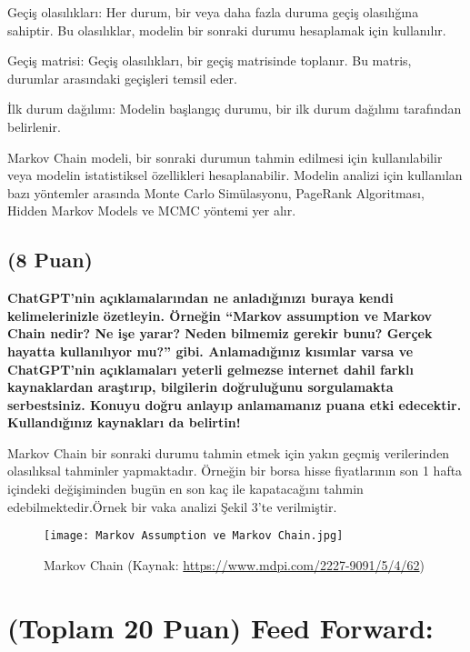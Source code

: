 \documentclass[11pt]{article}
\begin{document}
Geçiş olasılıkları: Her durum, bir veya daha fazla duruma geçiş olasılığına sahiptir. Bu olasılıklar, modelin bir sonraki durumu hesaplamak için kullanılır.

Geçiş matrisi: Geçiş olasılıkları, bir geçiş matrisinde toplanır. Bu matris, durumlar arasındaki geçişleri temsil eder.

İlk durum dağılımı: Modelin başlangıç durumu, bir ilk durum dağılımı tarafından belirlenir.

Markov Chain modeli, bir sonraki durumun tahmin edilmesi için kullanılabilir veya modelin istatistiksel özellikleri hesaplanabilir. Modelin analizi için kullanılan bazı yöntemler arasında Monte Carlo Simülasyonu, PageRank Algoritması, Hidden Markov Models ve MCMC yöntemi yer alır.

\subsection{(8 Puan)} \textbf{ChatGPT’nin açıklamalarından ne anladığınızı buraya kendi kelimelerinizle özetleyin. Örneğin ``Markov assumption ve Markov Chain nedir? Ne işe yarar? Neden bilmemiz gerekir bunu? Gerçek hayatta kullanılıyor mu?'' gibi. Anlamadığınız kısımlar varsa ve ChatGPT’nin açıklamaları yeterli gelmezse internet dahil farklı kaynaklardan araştırıp, bilgilerin doğruluğunu sorgulamakta serbestsiniz. Konuyu doğru anlayıp anlamamanız puana etki edecektir. Kullandığınız kaynakları da belirtin!}

Markov Chain bir sonraki durumu tahmin etmek için yakın geçmiş verilerinden olasılıksal tahminler yapmaktadır. Örneğin bir borsa hisse fiyatlarının son 1 hafta içindeki değişiminden bugün en son kaç ile kapatacağını tahmin edebilmektedir.Örnek bir vaka analizi Şekil 3'te verilmiştir.

\begin{figure}[h]
  \centering
  \shorthandoff{=}
  \texttt{[image: Markov Assumption ve Markov Chain.jpg]}
  \shorthandoff{=}
  \caption[Şekil 1]{Markov Chain (Kaynak: \url{https://www.mdpi.com/2227-9091/5/4/62})}
  \label{fig:Şekil 1}
\end{figure}
\newpage
\section{(Toplam 20 Puan) Feed Forward:}
 
\end{document}
